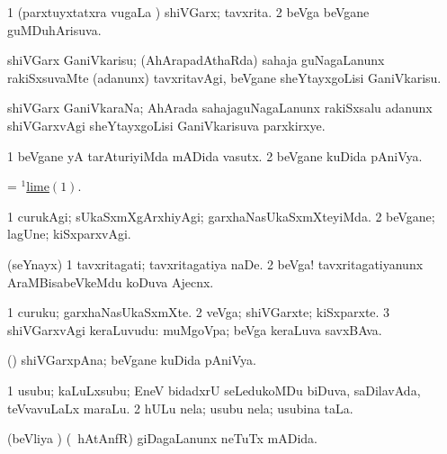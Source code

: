 \bentry
{}
\gl{\gu}
\bmng
\bnum
\num{1} (parxtuyxtatxra \mo vugaLa \vi) shiVGarx; tavxrita. 
\num{2} beVga beVgane guMDuhArisuva. 
\enum
\emng
\eentry

\bentry
{}
\gl{\sakirx}
\bmng
shiVGarx GaniVkarisu; (AhArapadAthaRda) sahaja guNagaLanunx rakiSxsuvaMte (adanunx) tavxritavAgi, beVgane sheYtayxgoLisi GaniVkarisu. 
\emng
\eentry

\bentry
{}
\gl{\nA}
\expl{}
\bmng
shiVGarx GaniVkaraNa; AhArada sahajaguNagaLanunx rakiSxsalu adanunx shiVGarxvAgi sheYtayxgoLisi GaniVkarisuva parxkirxye. 
\emng
\eentry

\bentry
{}
\gl{\nA (\AmA)}
\bmng
\bnum
\num{1} beVgane yA tarAturiyiMda mADida vasutx. 
\num{2} beVgane kuDida pAniVya. 
\enum
\emng
\eentry

\bentry
{}
\gl{\nA}
\bmng
= \hyperref{kandict_l.pdf}{L}{lime(1)}{$^1$lime\((1)\)}. 
\emng
\eentry

\bentry
{}
\gl{\kirxvi}
\bmng
\bnum
\num{1} curukAgi; sUkaSxmXgArxhiyAgi; garxhaNasUkaSxmXteyiMda. 
\num{2} beVgane; lagUne; kiSxparxvAgi. 
\enum
\emng
\eentry

\bentry
{}
\gl{\nA}
\expl{}
\bmng
(seYnayx) 
\bnum
\num{1} tavxritagati; tavxritagatiya naDe. 
\num{2} beVga! tavxritagatiyanunx AraMBisabeVkeMdu koDuva Ajecnx. 
\enum
\emng
\eentry

\bentry
{}
\gl{\nA}
\bmng
\bnum
\num{1} curuku; garxhaNasUkaSxmXte. 
\num{2} veVga; shiVGarxte; kiSxparxte. 
\num{3} shiVGarxvAgi keraLuvudu:  muMgoVpa; beVga keraLuva savxBAva. 
\enum
\emng
\eentry

\bentry
{}
\gl{\nA}
\expl{}
\bmng
(\AmA) shiVGarxpAna; beVgane kuDida pAniVya. 
\emng
\eentry

\bentry
{}
\gl{\nA}
\bmng
\bnum
\num{1} usubu; kaLuLxsubu; EneV bidadxrU seLedukoMDu biDuva, saDilavAda, teVvavuLaLx maraLu. 
\num{2} hULu nela; usubu nela; usubina taLa. 
\enum
\emng
\eentry

\bentry
{}
\gl{\gu}
\bmng
(beVliya \vi) (\kanmu\ hAtAnfR) giDagaLanunx neTuTx mADida. 
\emng
\eentry

